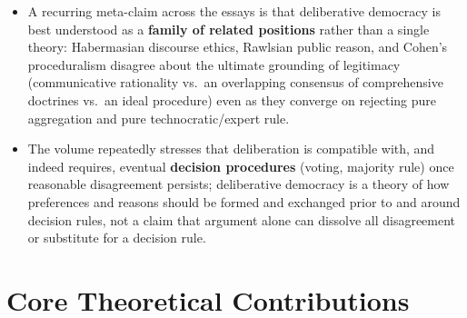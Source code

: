 \documentclass[12pt]{article}
\begin{document}
\begin{itemize}[leftmargin=*, itemsep=4pt]
    \item A recurring meta-claim across the essays is that deliberative democracy is best understood as a \textbf{family of related positions} rather than a single theory: Habermasian discourse ethics, Rawlsian public reason, and Cohen's proceduralism disagree about the ultimate grounding of legitimacy (communicative rationality vs.\ an overlapping consensus of comprehensive doctrines vs.\ an ideal procedure) even as they converge on rejecting pure aggregation and pure technocratic/expert rule.
    \item The volume repeatedly stresses that deliberation is compatible with, and indeed requires, eventual \textbf{decision procedures} (voting, majority rule) once reasonable disagreement persists; deliberative democracy is a theory of how preferences and reasons should be formed and exchanged prior to and around decision rules, not a claim that argument alone can dissolve all disagreement or substitute for a decision rule.
\end{itemize}

\section{Core Theoretical Contributions}
\end{document}
